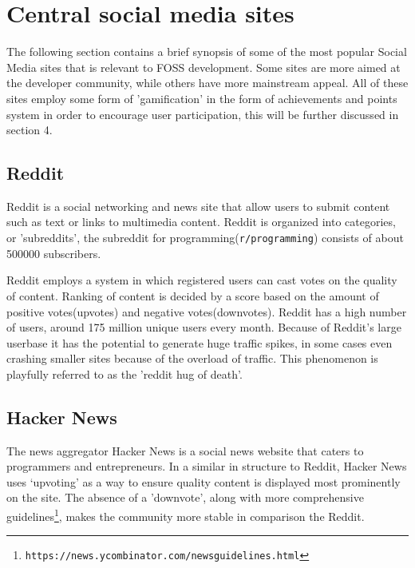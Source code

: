 \documentclass[a4paper,11pt]{article} %
\begin{document}
\section{Central social media sites}

The following section contains a brief synopsis of some of the most popular
Social Media sites that is relevant to FOSS development. Some sites are more
aimed at the developer community, while others have more mainstream appeal.
All of these sites employ some form of 'gamification' in the form of achievements
and points system in order to encourage user participation, this will be further
discussed in section 4. 

\subsection{Reddit}

Reddit is a social networking and news site that allow users to submit
content such as text or links to multimedia content. Reddit is organized
into categories, or 'subreddits', the subreddit for
programming(\texttt{r/programming}) consists of about \num{500000}
subscribers.

Reddit employs a system in which registered users can cast votes on the
quality of content. Ranking of content is decided by a score based on the
amount of positive votes(upvotes) and negative votes(downvotes). Reddit has
a high number of users, around 175 million unique users every month. Because
of Reddit's large userbase it has the potential to generate huge traffic
spikes, in some cases even crashing smaller sites because of the overload of
traffic. This phenomenon is playfully referred to as the 'reddit hug of
death’.


\subsection{Hacker News}
The news aggregator Hacker News is a social news website that caters to
programmers and entrepreneurs. In a similar in structure to Reddit, Hacker
News uses ‘upvoting’ as a way to ensure quality content is displayed most
prominently on the site. The absence of a 'downvote', along with more
comprehensive
guidelines\footnote{\texttt{https://news.ycombinator.com/newsguidelines.html}},
makes the community more stable in comparison the Reddit.
\end{document}
